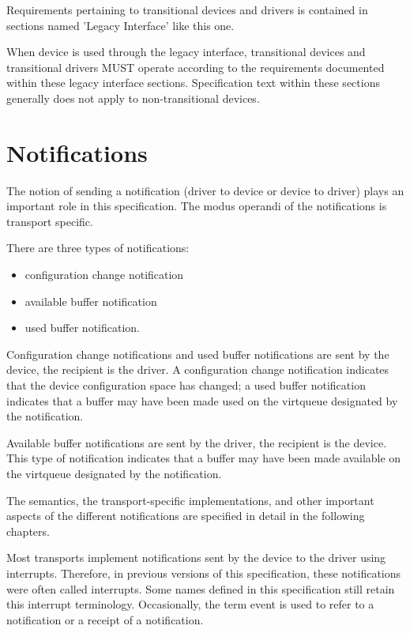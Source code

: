 Requirements pertaining to transitional devices and drivers
is contained in sections named 'Legacy Interface' like this one.

When device is used through the legacy interface, transitional
devices and transitional drivers MUST operate according to the
requirements documented within these legacy interface sections.
Specification text within these sections generally does not apply
to non-transitional devices.

\section{Notifications}\label{sec:Basic Facilities of a Virtio Device
/ Notifications}

The notion of sending a notification (driver to device or device
to driver) plays an important role in this specification. The
modus operandi of the notifications is transport specific.

There are three types of notifications: 
\begin{itemize}
\item configuration change notification
\item available buffer notification
\item used buffer notification. 
\end{itemize}

Configuration change notifications and used buffer notifications are sent
by the device, the recipient is the driver. A configuration change
notification indicates that the device configuration space has changed; a
used buffer notification indicates that a buffer may have been made used
on the virtqueue designated by the notification.

Available buffer notifications are sent by the driver, the recipient is
the device. This type of notification indicates that a buffer may have
been made available on the virtqueue designated by the notification.

The semantics, the transport-specific implementations, and other
important aspects of the different notifications are specified in detail
in the following chapters.

Most transports implement notifications sent by the device to the
driver using interrupts. Therefore, in previous versions of this
specification, these notifications were often called interrupts.
Some names defined in this specification still retain this interrupt
terminology. Occasionally, the term event is used to refer to
a notification or a receipt of a notification.


